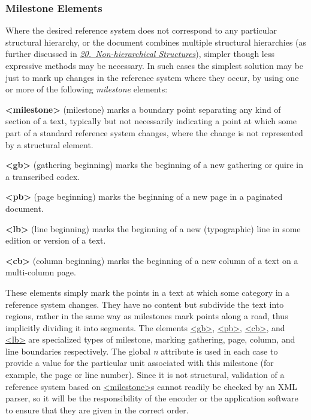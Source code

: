 \subsubsection[{Milestone Elements}]{Milestone Elements}\label{CORS5}\par
Where the desired reference system does not correspond to any particular structural hierarchy, or the document combines multiple structural hierarchies (as further discussed in \textit{\hyperref[NH]{20.\ Non-hierarchical Structures}}), simpler though less expressive methods may be necessary. In such cases the simplest solution may be just to mark up changes in the reference system where they occur, by using one or more of the following \textit{milestone} elements: 
\begin{sansreflist}
  
\item [\textbf{<milestone>}] (milestone) marks a boundary point separating any kind of section of a text, typically but not necessarily indicating a point at which some part of a standard reference system changes, where the change is not represented by a structural element.
\item [\textbf{<gb>}] (gathering beginning) marks the beginning of a new gathering or quire in a transcribed codex.
\item [\textbf{<pb>}] (page beginning) marks the beginning of a new page in a paginated document.
\item [\textbf{<lb>}] (line beginning) marks the beginning of a new (typographic) line in some edition or version of a text.
\item [\textbf{<cb>}] (column beginning) marks the beginning of a new column of a text on a multi-column page.
\end{sansreflist}
\par
These elements simply mark the points in a text at which some category in a reference system changes. They have no content but subdivide the text into regions, rather in the same way as milestones mark points along a road, thus implicitly dividing it into segments. The elements \hyperref[TEI.gb]{<gb>}, \hyperref[TEI.pb]{<pb>}, \hyperref[TEI.cb]{<cb>}, and \hyperref[TEI.lb]{<lb>} are specialized types of milestone, marking gathering, page, column, and line boundaries respectively. The global {\itshape n} attribute is used in each case to provide a value for the particular unit associated with this milestone (for example, the page or line number). Since it is not structural, validation of a reference system based on \hyperref[TEI.milestone]{<milestone>}s cannot readily be checked by an XML parser, so it will be the responsibility of the encoder or the application software to ensure that they are given in the correct order.\par
